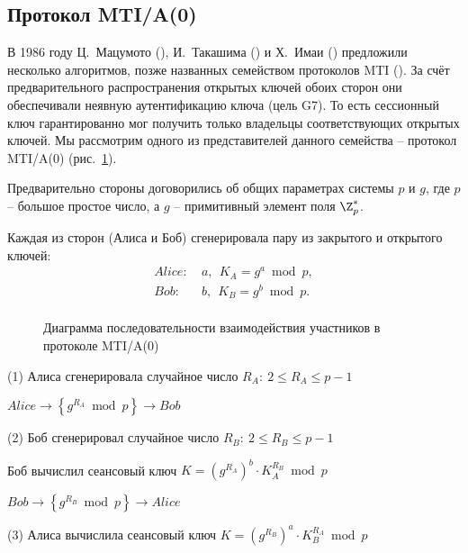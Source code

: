 \subsection{Протокол MTI/A(0)}\label{section-protocols-mti}

В 1986 году Ц.~Мацумото (), И.~Такашима () и Х.~Имаи () предложили несколько алгоритмов, позже названных семейством протоколов MTI (\cite{Matsumoto:Tsutomu:Imai:1986}). За счёт предварительного распространения открытых ключей обоих сторон они обеспечивали неявную аутентификацию ключа (цель G7). То есть сессионный ключ гарантированно мог получить только владельцы соответствующих открытых ключей. Мы рассмотрим одного из представителей данного семейства -- протокол MTI/A(0) (рис.~\ref{fig:key_distribution-mti}).

Предварительно стороны договорились об общих параметрах системы $p$ и $g$, где $p$ -- большое простое число, а $g$ -- примитивный элемент поля $\Z_p^*$.

Каждая из сторон (Алиса и Боб) сгенерировала пару из закрытого и открытого ключей:
\[\begin{array}{ll}
    Alice: & ~ a, ~~ K_A = g^a \bmod p, \\
    Bob: & ~ b, ~~ K_B = g^b \bmod p. \\
\end{array}\]

\begin{figure}[thb]
	\centering
	\begin{sequencediagram}

	\end{sequencediagram}
    \caption{Диаграмма последовательности взаимодействия участников в протоколе MTI/A(0)\label{fig:key_distribution-mti}}
\end{figure}

\begin{protocol}
    \item[(1)] Алиса сгенерировала случайное число $R_A: ~ 2\leq R_A\leq p-1$
    \item[{}] $ Alice \to \left\{ g^{R_A} \bmod p \right\} \to Bob$
    \item[(2)] Боб сгенерировал случайное число $R_B: ~ 2\leq R_B\leq p-1$
    \item[{}] Боб вычислил сеансовый ключ $K = (g^{R_A})^b \cdot K_A^{R_B} \bmod p$
    \item[{}] $ Bob \to \left\{ g^{R_B} \bmod p \right\} \to Alice$
    \item[(3)] Алиса вычислила сеансовый ключ $K = (g^{R_B})^a \cdot K_B^{R_A} \bmod p$
\end{protocol}

